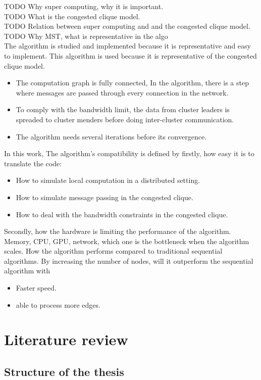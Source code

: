 \documentclass[english, 12pt, a4paper, sci, utf8, a-2b, online]{aaltothesis}
\begin{document}
TODO Why super computing, why it is important.\\
TODO What is the congested clique model.\\
TODO Relation between super computing and and the congested clique model.\\
TODO Why MST, what is representative in the algo\\
The algorithm is studied and implemented because it is representative and easy to implement. This algorithm is used because it is representative of the congested clique model.
\begin{itemize}
	\item[--] The computation graph is fully connected, In the algorithm, there is a step where messages are passed through every connection in the network.
	\item[--] To comply with the bandwidth limit, the data from cluster leaders is spreaded to cluster menders before doing inter-cluster communication.
	\item[--] The algorithm needs several iterations before its convergence.
\end{itemize}
In this work, The algorithm's compatibility is defined by firstly, how easy it is to translate the code:
\begin{itemize}
	\item[--] How to simulate local computation in a distributed setting.
	\item[--] How to simulate message passing in the congested clique.
	\item[--] How to deal with the bandwidth constraints in the congested clique.
\end{itemize}
Secondly, how the hardware is limiting the performance of the algorithm. Memory, CPU, GPU, network, which one is the bottleneck when the algorithm scales.
How the algorithm performs compared to traditional sequential algorithms. By increasing the number of nodes, will it outperform the sequential algorithm with
\begin{itemize}
	\item[--] Faster speed.
	\item[--] able to process more edges.
\end{itemize}

\clearpage

\section{Literature review}
\subsection{Structure of the thesis}
\end{document}
